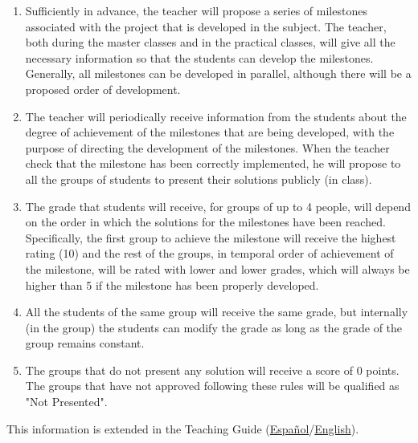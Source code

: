 \begin{enumerate}
\item Sufficiently in advance, the teacher will propose a series of
  milestones associated with the project that is developed in the
  subject. The teacher, both during the master classes and in the
  practical classes, will give all the necessary information so that
  the students can develop the milestones. Generally, all milestones
  can be developed in parallel, although there will be a proposed
  order of development.
\item The teacher will periodically receive information from the
  students about the degree of achievement of the milestones that are
  being developed, with the purpose of directing the development of
  the milestones. When the teacher check that the milestone has been
  correctly implemented, he will propose to all the groups of students
  to present their solutions publicly (in class).
\item The grade that students will receive, for groups of up to 4
  people, will depend on the order in which the solutions for the
  milestones have been reached. Specifically, the first group to
  achieve the milestone will receive the highest rating (10) and the
  rest of the groups, in temporal order of achievement of the
  milestone, will be rated with lower and lower grades, which will
  always be higher than 5 if the milestone has been properly
  developed.
\item All the students of the same group will receive the same grade,
  but internally (in the group) the students can modify the grade as
  long as the grade of the group remains constant.
\item The groups that do not present any solution will receive a score
  of 0 points. The groups that have not approved following these rules will
  be qualified as "Not Presented".
\end{enumerate}

This information is extended in the Teaching Guide
(\href{https://portafirma.ual.es/pfirma/downloadReport/file?idDocument=4Jp82utmug&idRequest=QY36GYcOZQ}{Español}/\href{https://portafirma.ual.es/pfirma/downloadReport/file?idDocument=Zcmom6qigD&idRequest=xXgueuk9oD}{English}).
